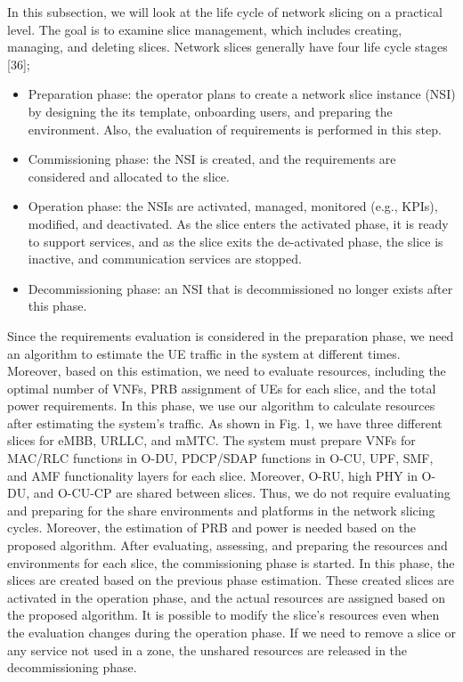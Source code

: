 \documentclass[12pt, letterpaper]{article}
\begin{document}
In this subsection, we will look at the life cycle of network slicing on a practical level. 
The goal is to examine slice management, which includes creating, managing, and deleting slices. Network slices generally have four life cycle stages [36];
\begin{itemize}
\item Preparation phase: the operator plans to create a network slice instance (NSI) by designing the its template, onboarding users, and preparing the environment. Also, the evaluation of requirements is performed in this step.
\item Commissioning phase: the NSI is created, and the requirements are considered and allocated to the slice.
\item Operation phase: the NSIs are activated, managed, monitored (e.g., KPIs), modified, and deactivated. As the slice enters the activated phase, it is ready to support services, and as the slice exits the de-activated phase, the slice is inactive, and communication services are stopped.
\item Decommissioning phase: an NSI that is decommissioned no longer exists after this phase.
\end{itemize}
Since the requirements evaluation is considered in the preparation phase, we need an algorithm to estimate the UE traffic in the system at different times. Moreover, based on this estimation, we need to evaluate resources, including the optimal number of VNFs, PRB assignment of UEs for each slice, and the total power requirements. In this phase, we use our algorithm to calculate resources after estimating the system's traffic.
As shown in Fig. 1, we have three different slices for eMBB, URLLC, and mMTC. The system must prepare VNFs for MAC/RLC functions in O-DU, PDCP/SDAP functions in O-CU, UPF, SMF, and AMF functionality layers for each slice. Moreover, O-RU, high PHY in O-DU, and O-CU-CP are shared between slices. Thus, we do not require evaluating and preparing for the share environments and platforms in the network slicing cycles. Moreover, the estimation of PRB and power is needed based on the proposed algorithm. 
After evaluating, assessing, and preparing the resources and environments for each slice, the commissioning phase is started. In this phase, the slices are created based on the previous phase estimation. These created slices are activated in the operation phase, and the actual resources are assigned based on the proposed algorithm.
It is possible to modify the slice's resources even when the evaluation changes during the operation phase. 
If we need to remove a slice or any service not used in a zone, the unshared resources are released in the decommissioning phase.
\end{document}
